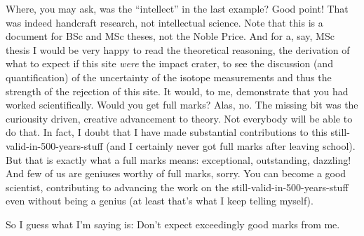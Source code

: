 Where, you may ask, was the ``intellect'' in the last example? Good point! That was indeed handcraft research, not intellectual science. Note that this is a document for BSc and MSc theses, not the Noble Price. And for a, say, MSc thesis I would be very happy to read the theoretical reasoning, the derivation of what to expect if this site \emph{were} the impact crater, to see the discussion (and quantification) of the uncertainty of the isotope measurements and thus the strength of the rejection of this site. It would, to me, demonstrate that you had worked scientifically. Would you get full marks? Alas, no. The missing bit was the curiousity driven, creative advancement to theory. Not everybody will be able to do that. In fact, I doubt that I have made substantial contributions to this still-valid-in-500-years-stuff (and I certainly never got full marks after leaving school). But that is exactly what a full marks means: exceptional, outstanding, dazzling! And few of us are geniuses worthy of full marks, sorry. You can become a good scientist, contributing to advancing the work on the still-valid-in-500-years-stuff even without being a genius (at least that's what I keep telling myself).

So I guess what I'm saying is: Don't expect exceedingly good marks from me.

